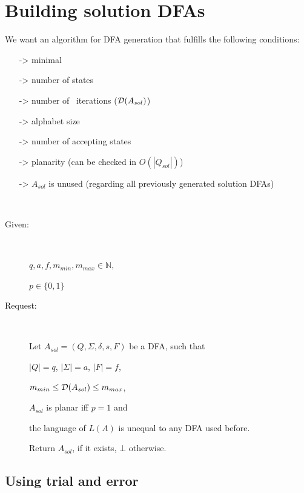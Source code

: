 
\chapter{Building solution DFAs} \label{ch:2}


We want an algorithm for DFA generation that fulfills the following conditions:
\begin{itemize}
	\item[->] minimal
	\item[->] number of states
	\item[->] number of \MinMark\ iterations ($\mathcal{D}(A_{sol})$)
	\item[->] alphabet size
	\item[->] number of accepting states
	\item[->] planarity (can be checked in $O(|Q_{sol}|)$)
	\item[->] $A_{sol}$ is unused (regarding all previously generated solution DFAs)
\end{itemize}

\begin{definition}[BuildNewMinimalDFA] $ $
	\begin{description}
		
		\item[Given:] $ $
		
		$q, a, f, m_{min}, m_{max} \in \mathbb{N},$
		
		$p \in \{0,1\}$
		\item[Request:] $ $
		
		Let $A_{sol} = (Q, \Sigma, \delta, s, F)$ be a DFA, such that
		
		\qquad $|Q|=q$, $|\Sigma|=a$, $|F|=f$,
		
		\qquad $m_{min} \le \mathcal{D}(A_{sol}) \le m_{max}$,
		
		\qquad $A_{sol}$ is planar iff $p = 1$ and
		
		\qquad the language of $L(A)$ is unequal to any DFA used before.
		
		Return $A_{sol}$, if it exists, $\bot$ otherwise.
	\end{description}
\end{definition}

\section{Using trial and error}

